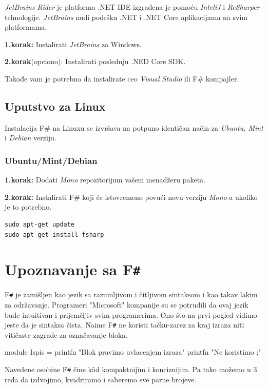 \documentclass[a4paper]{article}
\begin{document}
{\em JetBrains Rider} je platforma .NET IDE izgrađena je pomoću {\em InteliJ} i {\em ReSharper} tehnologije. {\em JetBrains} nudi podršku .NET i .NET Core aplikacijama na svim platformama.

\textbf{1.korak:} Instalirati {\em JetBrains} za Windows.

\textbf{2.korak}(opciono): Instalirati poslednju .NED Core SDK.

Takođe vam je potrebno da instalirate ceo {\em Visual Studio} ili F\# kompajler.


\subsection{Uputstvo za Linux}

Instalacija F\# na Linuxu se izvršava na potpuno identičan način za {\em Ubuntu, Mint} i {\em Debian} verziju.

\subsubsection{Ubuntu/Mint/Debian}

\textbf{1.korak:} Dodati {\em Mono}\cite{mono} repozitorijum vašem menadžeru paketa.

\textbf{2.korak:} Instalirati F\# koji će istovremeno povući novu verziju {\em Mono}-a ukoliko je to potrebno.
\\
\begin{lstlisting}
sudo apt-get update
sudo apt-get install fsharp
\end{lstlisting}
 

\section{Upoznavanje sa F\texttt{\#}}

F\texttt{\#} je zamišljen kao jezik sa razumljivom i čitljivom sintaksom i kao takav lakim za održavanje. Programeri "Microsoft" kompanije su se potrudili da ovaj jezik bude intuitivan i prijemčljiv svim programerima. Ono što na prvi pogled vidimo jeste da je sintaksa čista. Naime F\texttt{\#} ne koristi tačku-zarez za kraj izraza niti vitičaste zagrade za označavanje bloka.

\begin{fslisting}
module Ispis =
    printfn "Blok pravimo uvlacenjem izraza"
    printfn "Ne koristimo ;"
\end{fslisting}

Navedene osobine F\texttt{\#} čine k\^{o}d kompaktnijim i konciznijim. Pa tako možemo u 3 reda da izdvojimo, kvadriramo i saberemo sve parne brojeve.
\end{document}
